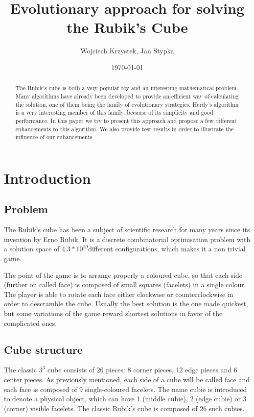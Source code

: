 \documentclass[a4paper]{article}
\title{Evolutionary approach for solving the Rubik’s Cube}
\author{Wojciech Krzystek, Jan Stypka}
\date{\today}
\begin{document}
\maketitle

\begin{abstract}
The Rubik's cube is both a very popular toy and an interesting mathematical problem. Many algorithms have already been developed to provide an efficient way of calculating the solution, one of them being the family of evolutionary strategies. Herdy's algorithm is a very interesting member of this family, because of its simplicity and good performance. In this paper we try to present this approach and propose a few different enhancements to this algorithm. We also provide test results in order to illustrate the influence of our enhancements.
\end{abstract}

\section{Introduction}
\subsection{Problem}

The Rubik’s cube has been a subject of scientific research for many years since its invention by Erno Rubik. It is a discrete combinatorial optimisation problem with a solution space of \(4.3*10^{19}\)different configurations, which makes it a non trivial game.

The point of the game is to arrange properly a coloured cube, so that each side (further on called face) is composed of small squares (facelets) in a single colour. The player is able to rotate each face either clockwise or counterclockwise in order to descramble the cube.
Usually the best solution is the one made quickest, but some variations of the game reward shortest solutions in favor of the complicated ones.

\subsection{Cube structure}
The classic \(3^3\) cube consists of  26 pieces: 8 corner pieces, 12 edge pieces and 6 center pieces. As previously mentioned, each side of a cube will be called face and each face is composed of 9 single-coloured facelets. The name cubie is introduced to denote a physical object, which can have 1 (middle cubie), 2 (edge cubie) or 3 (corner) visible facelets. The classic Rubik’s cube is composed of 26 such cubies.
\end{document}
